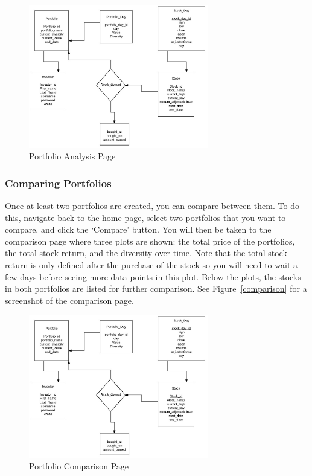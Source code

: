 \documentclass{article}
\begin{document}
\begin{figure}[H]
\begin{center}
\includegraphics[width=0.7\textwidth]{db_diagram}
\caption{\label{fig:analysis} Portfolio Analysis Page}
\end{center}
\end{figure}

\subsubsection{Comparing Portfolios}
Once at least two portfolios are created, you can compare between them. To do this, navigate back to the home page, select two portfolios that you want to compare, and click the `Compare' button. You will then be taken to the comparison page where three plots are shown: the total price of the portfolios, the total stock return, and the diversity over time. Note that the total stock return is only defined after the purchase of the stock so you will need to wait a few days before seeing more data points in this plot. Below the plots, the stocks in both portfolios are listed for further comparison. See Figure~\ref{comparison} for a screenshot of the comparison page.

\begin{figure}[H]
\begin{center}
\includegraphics[width=0.7\textwidth]{db_diagram}
\caption{\label{fig:comparison} Portfolio Comparison Page}
\end{center}
\end{figure}
\end{document}
